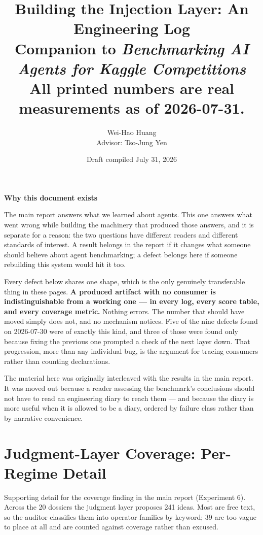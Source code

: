\documentclass[11pt,a4paper]{article}
\title{\textbf{Building the Injection Layer: An Engineering Log}\\
\large Companion to \emph{Benchmarking AI Agents for Kaggle Competitions}\\
\normalsize\textcolor{orange!85!black}{All printed numbers are real measurements as of 2026-07-31.}}
\author{Wei-Hao Huang\\\small Advisor: Tso-Jung Yen}
\date{Draft compiled July 31, 2026}
\begin{document}
\maketitle

\begin{center}\textbf{\large Why this document exists}\end{center}
\noindent The main report answers what we learned about agents. This one answers what went
wrong while building the machinery that produced those answers, and it is separate for a
reason: the two questions have different readers and different standards of interest. A
result belongs in the report if it changes what someone should believe about agent
benchmarking; a defect belongs here if someone rebuilding this system would hit it too.

Every defect below shares one shape, which is the only genuinely transferable thing in these
pages. \textbf{A produced artifact with no consumer is indistinguishable from a working one
--- in every log, every score table, and every coverage metric.} Nothing errors. The number
that should have moved simply does not, and no mechanism notices. Five of the nine defects
found on 2026-07-30 were of exactly this kind, and three of those were found only because
fixing the previous one prompted a check of the next layer down. That progression, more than
any individual bug, is the argument for tracing consumers rather than counting declarations.

The material here was originally interleaved with the results in the main report. It was
moved out because a reader assessing the benchmark's conclusions should not have to read an
engineering diary to reach them --- and because the diary is more useful when it is allowed
to be a diary, ordered by failure class rather than by narrative convenience.

\vspace{0.5em}

\section{Judgment-Layer Coverage: Per-Regime Detail}
\label{app:coverage}

Supporting detail for the coverage finding in the main report (Experiment 6). Across the 20 dossiers
the judgment layer proposes 241 ideas. Most are free text, so the auditor classifies them into
operator families by keyword; 39 are too vague to place at all and are counted against coverage
rather than excused.
\end{document}
